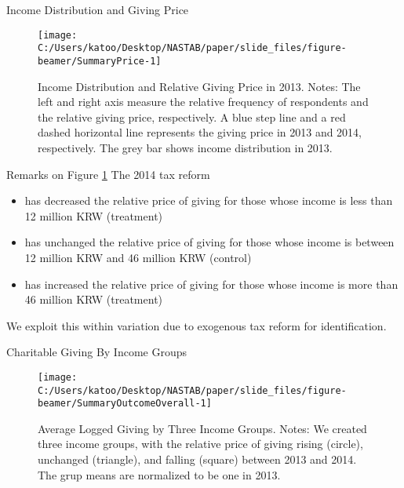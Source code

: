 \documentclass[
  ignorenonframetext,
  aspectratio=169,
]{beamer}
\providecommand{\tightlist}{%
  \setlength{\itemsep}{0pt}\setlength{\parskip}{0pt}}
\begin{document}
\begin{frame}{Income Distribution and Giving Price}
\protect\hypertarget{income-distribution-and-giving-price}{}
\begin{figure}[t]

{\centering \texttt{[image: C:/Users/katoo/Desktop/NASTAB/paper/slide\_files/figure-beamer/SummaryPrice-1]} 

}

\caption{Income Distribution and Relative Giving Price in 2013. Notes: The left and right axis measure the relative frequency of respondents and the relative giving price, respectively. A blue step line and a red dashed horizontal line represents the giving price in 2013 and 2014, respectively. The grey bar shows income distribution in 2013.}\label{fig:SummaryPrice}
\end{figure}
\end{frame}

\begin{frame}{Remarks on Figure \ref{fig:SummaryPrice}}
\protect\hypertarget{remarks-on-figure-reffigsummaryprice}{}
The 2014 tax reform

\begin{itemize}
\tightlist
\item
  has decreased the relative price of giving for those whose income is less than 12 million KRW (treatment)
\item
  has unchanged the relative price of giving for those whose income is between 12 million KRW and 46 million KRW (control)
\item
  has increased the relative price of giving for those whose income is more than 46 million KRW (treatment)
\end{itemize}

We exploit this within variation due to exogenous tax reform
for identification.
\end{frame}

\begin{frame}{Charitable Giving By Income Groups}
\protect\hypertarget{charitable-giving-by-income-groups}{}
\begin{figure}[t]

{\centering \texttt{[image: C:/Users/katoo/Desktop/NASTAB/paper/slide\_files/figure-beamer/SummaryOutcomeOverall-1]} 

}

\caption{Average Logged Giving by Three Income Groups. Notes: We created three income groups, with the relative price of giving rising (circle), unchanged (triangle), and falling (square) between 2013 and 2014. The grup means are normalized to be one in 2013.}\label{fig:SummaryOutcomeOverall}
\end{figure}
\end{frame}
\end{document}
